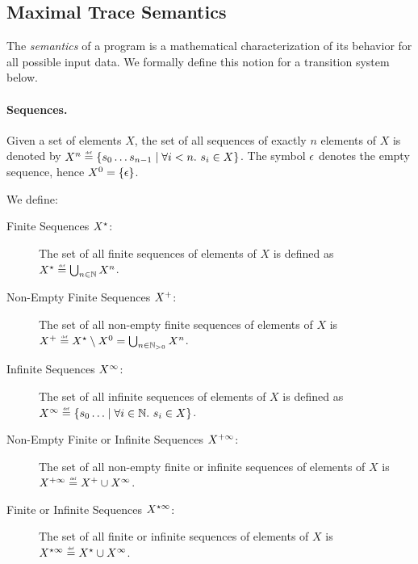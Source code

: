 \subsection{Maximal Trace Semantics}

The \emph{semantics} of a program is a mathematical characterization of its behavior for all possible input data. We formally define this notion for a transition system below.

\paragraph{Sequences.}
Given a set of elements $X$, the set of all sequences of exactly $n$ elements of $X$ is denoted by $X^n\defeq\setdef{\defstate_0 \dots \defstate_{n-1}}{\forall i < n.\spacer s_i \in X}$.
The symbol $\epsilon$ denotes the empty sequence, hence $X^0 = \{\epsilon\}$.

We define:
\begin{description}
  \item[Finite Sequences $X^\star$:] The set of all finite sequences of elements of $X$ is defined as $\retrievefiniteoremptytraces{X} \defeq \bigsetjoin_{n \in \N} X^n$.
  \item[Non-Empty Finite Sequences $X^+$:] The set of all non-empty finite sequences of elements of $X$ is $\retrievefinitetraces{X} \defeq \retrievefiniteoremptytraces{X} \setminus X^0 = \bigsetjoin_{n \in \Nposstrict} X^n$.
  \item[Infinite Sequences $X^\infty$:] The set of all infinite sequences of elements of $X$ is defined as  $\retrieveinfinitetraces{X} \defeq \setdef{\defstate_0 \dots}{\forall i \in \N.\spacer \defstate_i \in X}$.
  \item[Non-Empty Finite or Infinite Sequences $X^{+\infty}$:] The set of all non-empty finite or infinite sequences of elements of $X$ is $\retrievefiniteinfinitetraces{X} \defeq \retrievefinitetraces{X} \cup \retrieveinfinitetraces{X}$.
  \item[Finite or Infinite Sequences $X^{\star\infty}$:] The set of all finite or infinite sequences of elements of $X$ is $\retrievefiniteoremptyinfinitetraces{X} \defeq \retrievefiniteoremptytraces{X} \cup \retrieveinfinitetraces{X}$.
\end{description}

